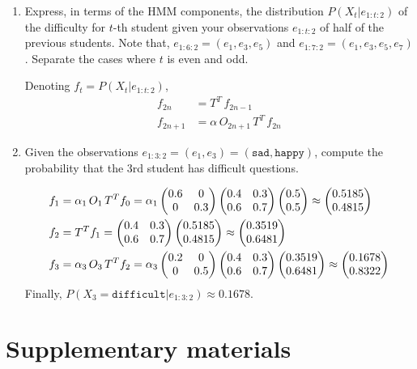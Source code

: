 \documentclass[11pt, a4paper]{article}
\begin{document}
\begin{enumerate}
    \item Express, in terms of the HMM components, the distribution $P(X_t | e_{1:t:2})$ of the difficulty for $t$-th student given your observations $e_{1:t:2}$ of half of the previous students. Note that, $e_{1:6:2} = (e_1, e_3, e_5)$ and $e_{1:7:2} = (e_1, e_3, e_5, e_7)$. Separate the cases where $t$ is even and odd.

    \begin{solution}
        Denoting $f_t = P(X_t | e_{1:t:2})$,
        \begin{align*}
            f_{2n} & = T^T \, f_{2n-1} \\
            f_{2n + 1} & = \alpha \, O_{2n+1} \, T^T \, f_{2n}
        \end{align*}
    \end{solution}

    \item Given the observations $e_{1:3:2} = (e_1, e_3) = (\texttt{sad}, \texttt{happy})$, compute the probability that the 3rd student has difficult questions.
    \begin{solution}
        \begin{align*}
            f_1 & = \alpha_1 \, O_1 \, T^T f_0 = \alpha_1 \begin{pmatrix}0.6 & 0 \\ 0 & 0.3\end{pmatrix} \begin{pmatrix}0.4 & 0.3 \\ 0.6 & 0.7\end{pmatrix} \begin{pmatrix}0.5 \\ 0.5\end{pmatrix} \approx \begin{pmatrix}0.5185 \\ 0.4815\end{pmatrix} \\
            f_2 & = T^T f_1 = \begin{pmatrix}0.4 & 0.3 \\ 0.6 & 0.7\end{pmatrix} \begin{pmatrix}0.5185 \\ 0.4815\end{pmatrix} \approx \begin{pmatrix}0.3519 \\ 0.6481\end{pmatrix} \\
            f_3 & = \alpha_3 \, O_3 \, T^T f_2 = \alpha_3 \begin{pmatrix}0.2 & 0 \\ 0 & 0.5\end{pmatrix} \begin{pmatrix}0.4 & 0.3 \\ 0.6 & 0.7\end{pmatrix} \begin{pmatrix}0.3519 \\ 0.6481\end{pmatrix} \approx \begin{pmatrix}0.1678 \\ 0.8322\end{pmatrix} \\
        \end{align*}
        Finally, $P(X_3 = \texttt{difficult} | e_{1:3:2}) \approx 0.1678$.
    \end{solution}
\end{enumerate}

\newpage

\section*{Supplementary materials}
\end{document}
